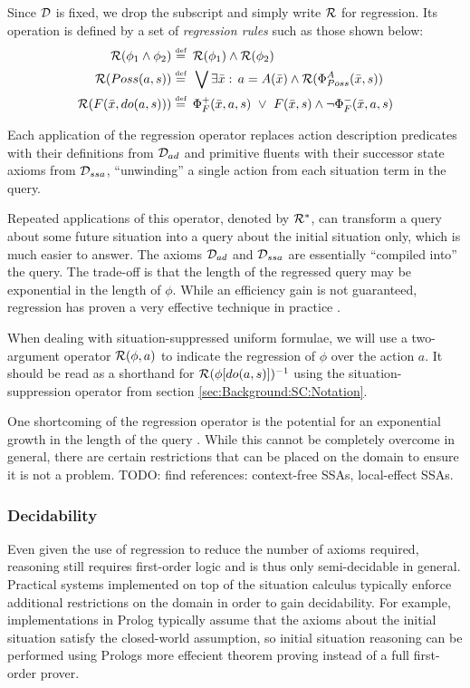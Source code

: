 Since $\mathcal{D}$ is fixed, we drop the subscript and simply write $\mathcal{R}$
for regression. Its operation is defined by a set of \emph{regression
rules} such as those shown below:\begin{align*}
\mathcal{R}(\phi_{1}\wedge\phi_{2})\stackrel{\mbox{\tiny def}}{=} & \,\,\,\mathcal{R}(\phi_{1})\wedge\mathcal{R}(\phi_{2})\\
\mathcal{R}(Poss(a,s))\stackrel{\mbox{\tiny def}}{=} & \,\,\,\bigvee\exists\bar{x}:\, a=A(\bar{x})\wedge\mathcal{R}(\Phi_{Poss}^{A}(\bar{x},s))\\
\mathcal{R}(F(\bar{x},do(a,s)))\stackrel{\mbox{\tiny def}}{=} & \,\,\,\Phi_{F}^{+}(\bar{x},a,s)\,\,\vee\,\, F(\bar{x},s)\wedge\neg\Phi_{F}^{-}(\bar{x},a,s)\end{align*}


Each application of the regression operator replaces action description
predicates with their definitions from $\mathcal{D}_{ad}$ and primitive fluents
with their successor state axioms from $\mathcal{D}_{ssa}$, {}``unwinding''
a single action from each situation term in the query.

Repeated applications of this operator, denoted by $\mathcal{R}^{*}$, can
transform a query about some future situation into a query about the
initial situation only, which is much easier to answer. The axioms
$\mathcal{D}_{ad}$ and $\mathcal{D}_{ssa}$ are essentially {}``compiled into''
the query. The trade-off is that the length of the regressed query
may be exponential in the length of $\phi$. While an efficiency gain
is not guaranteed, regression has proven a very effective technique
in practice \citep{levesque97golog,pirri99contributions_sitcalc}.

When dealing with situation-suppressed uniform formulae, we will use
a two-argument operator $\mathcal{R}(\phi,a)$ to indicate the regression
of $\phi$ over the action $a$. It should be read as a shorthand
for $\mathcal{R}(\phi[do(a,s)])^{-1}$ using the situation-suppression operator
from section \ref{sec:Background:SC:Notation}.

One shortcoming of the regression operator is the potential for an
exponential growth in the length of the query \citep{reiter91frameprob}.
While this cannot be completely overcome in general, there are certain
restrictions that can be placed on the domain to ensure it is not
a problem. TODO: find references: context-free SSAs, local-effect
SSAs.


\subsubsection{Decidability}

Even given the use of regression to reduce the number of axioms required,
reasoning still requires first-order logic and is thus only semi-decidable
in general. Practical systems implemented on top of the situation
calculus typically enforce additional restrictions on the domain in
order to gain decidability. For example, implementations in Prolog
typically assume that the axioms about the initial situation satisfy
the closed-world assumption, so initial situation reasoning can be
performed using Prologs more effecient theorem proving instead of
a full first-order prover.

